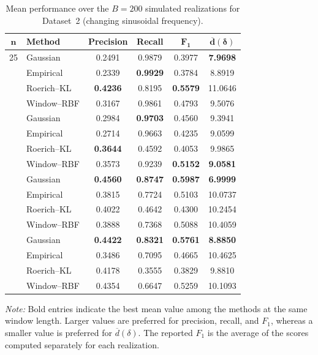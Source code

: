 \begin{table}[!htbp]
    \centering
    \caption{Mean performance over the \(B=200\) simulated realizations for Dataset~2 (changing sinusoidal frequency).}
    \label{tab:mean_metrics_dataset2}
    \small
    \setlength{\tabcolsep}{5pt}
    \renewcommand{\arraystretch}{1.08}
    \begin{tabular}{@{}clcccc@{}}
        \toprule
        \(\boldsymbol{n}\) & \textbf{Method} & \textbf{Precision} & \textbf{Recall} & \(\boldsymbol{F_1}\) & \(\boldsymbol{\overline{d}(\delta)}\) \\
        \midrule
        25 & Gaussian & 0.2491 & 0.9879 & 0.3977 & \textbf{7.9698} \\
         & Empirical & 0.2339 & \textbf{0.9929} & 0.3784 & 8.8919 \\
         & Roerich--KL & \textbf{0.4236} & 0.8195 & \textbf{0.5579} & 11.0646 \\
         & Window--RBF & 0.3167 & 0.9861 & 0.4793 & 9.5076 \\
        \addlinespace[2pt]
        30 & Gaussian & 0.2984 & \textbf{0.9703} & 0.4560 & 9.3941 \\
         & Empirical & 0.2714 & 0.9663 & 0.4235 & 9.0599 \\
         & Roerich--KL & \textbf{0.3644} & 0.4592 & 0.4053 & 9.9865 \\
         & Window--RBF & 0.3573 & 0.9239 & \textbf{0.5152} & \textbf{9.0581} \\
        \addlinespace[2pt]
        40 & Gaussian & \textbf{0.4560} & \textbf{0.8747} & \textbf{0.5987} & \textbf{6.9999} \\
         & Empirical & 0.3815 & 0.7724 & 0.5103 & 10.0737 \\
         & Roerich--KL & 0.4022 & 0.4642 & 0.4300 & 10.2454 \\
         & Window--RBF & 0.3888 & 0.7368 & 0.5088 & 10.4059 \\
        \addlinespace[2pt]
        50 & Gaussian & \textbf{0.4422} & \textbf{0.8321} & \textbf{0.5761} & \textbf{8.8850} \\
         & Empirical & 0.3486 & 0.7095 & 0.4665 & 10.4625 \\
         & Roerich--KL & 0.4178 & 0.3555 & 0.3829 & 9.8810 \\
         & Window--RBF & 0.4354 & 0.6647 & 0.5259 & 10.1093 \\
        \bottomrule
    \end{tabular}
    \begin{flushleft}
        \footnotesize \textit{Note:} Bold entries indicate the best mean value among the methods at the same window length. Larger values are preferred for precision, recall, and \(F_1\), whereas a smaller value is preferred for \(\overline{d}(\delta)\). The reported \(F_1\) is the average of the scores computed separately for each realization.
    \end{flushleft}
\end{table}
